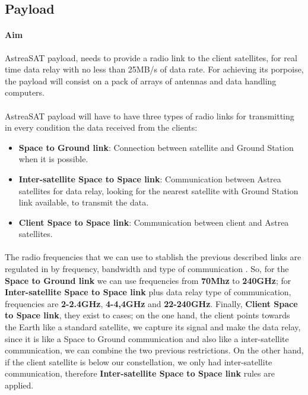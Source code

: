 \subsection{Payload}
\paragraph{Aim} AstreaSAT payload, needs to provide a radio link to the client satellites, for real time data relay with no less than 25MB/s of data rate. For achieving its porpoise, the payload will consist on a pack of arrays of antennas and data handling computers.

\paragraph{}AstreaSAT payload will have to have three types of radio links for transmitting in every condition the data received from the clients:
\begin{itemize}
	\item \textbf{Space to Ground link}: Connection between satellite and Ground Station when it is possible.
	\item \textbf{Inter-satellite Space to Space link}: Communication between Astrea satellites for data relay, looking for the nearest satellite with Ground Station link available, to transmit the data.
	\item \textbf{Client Space to Space link}: Communication between client and Astrea satellites.
\end{itemize}
\paragraph{}
The radio frequencies that we can use to stablish the previous described links are regulated in \cite{SecretariadeEstadodetelecomunicacionesyparalasociedaddelainformacion.2015} by frequency, bandwidth and type of communication . So, for the \textbf{Space to Ground link} we can use frequencies from \textbf{70Mhz} to \textbf{240GHz}; for \textbf{Inter-satellite Space to Space link} plus data relay type of communication, frequencies are \textbf{2-2.4GHz}, \textbf{4-4,4GHz} and \textbf{22-240GHz}. Finally, \textbf{Client Space to Space link}, they exist to cases; on the one hand, the client points towards the Earth like a standard satellite, we capture its signal and make the data relay, since it is like a Space to Ground communication and also like a inter-satellite communication, we can combine the two previous restrictions. On the other hand, if the client satellite is below our constellation, we only had inter-satellite communication, therefore \textbf{Inter-satellite Space to Space link} rules are applied.

